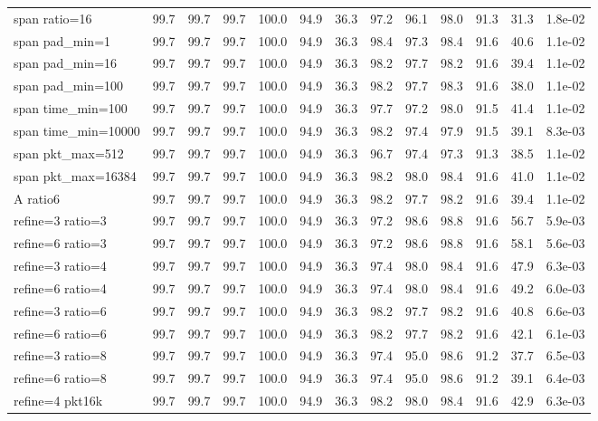\begin{tabular}{@{}lcccccccccccc@{}}
span ratio{=}16 & 99.7 & 99.7 & 99.7 & 100.0 & 94.9 & 36.3 & 97.2 & 96.1 & 98.0 & 91.3 & 31.3 & 1.8e-02 \\
span pad\_min{=}1 & 99.7 & 99.7 & 99.7 & 100.0 & 94.9 & 36.3 & 98.4 & 97.3 & 98.4 & 91.6 & 40.6 & 1.1e-02 \\
span pad\_min{=}16 & 99.7 & 99.7 & 99.7 & 100.0 & 94.9 & 36.3 & 98.2 & 97.7 & 98.2 & 91.6 & 39.4 & 1.1e-02 \\
span pad\_min{=}100 & 99.7 & 99.7 & 99.7 & 100.0 & 94.9 & 36.3 & 98.2 & 97.7 & 98.3 & 91.6 & 38.0 & 1.1e-02 \\
span time\_min{=}100 & 99.7 & 99.7 & 99.7 & 100.0 & 94.9 & 36.3 & 97.7 & 97.2 & 98.0 & 91.5 & 41.4 & 1.1e-02 \\
span time\_min{=}10000 & 99.7 & 99.7 & 99.7 & 100.0 & 94.9 & 36.3 & 98.2 & 97.4 & 97.9 & 91.5 & 39.1 & 8.3e-03 \\
span pkt\_max{=}512 & 99.7 & 99.7 & 99.7 & 100.0 & 94.9 & 36.3 & 96.7 & 97.4 & 97.3 & 91.3 & 38.5 & 1.1e-02 \\
span pkt\_max{=}16384 & 99.7 & 99.7 & 99.7 & 100.0 & 94.9 & 36.3 & 98.2 & 98.0 & 98.4 & 91.6 & 41.0 & 1.1e-02 \\
A ratio6 & 99.7 & 99.7 & 99.7 & 100.0 & 94.9 & 36.3 & 98.2 & 97.7 & 98.2 & 91.6 & 39.4 & 1.1e-02 \\
refine{=}3 ratio{=}3 & 99.7 & 99.7 & 99.7 & 100.0 & 94.9 & 36.3 & 97.2 & 98.6 & 98.8 & 91.6 & 56.7 & 5.9e-03 \\
refine{=}6 ratio{=}3 & 99.7 & 99.7 & 99.7 & 100.0 & 94.9 & 36.3 & 97.2 & 98.6 & 98.8 & 91.6 & 58.1 & 5.6e-03 \\
refine{=}3 ratio{=}4 & 99.7 & 99.7 & 99.7 & 100.0 & 94.9 & 36.3 & 97.4 & 98.0 & 98.4 & 91.6 & 47.9 & 6.3e-03 \\
refine{=}6 ratio{=}4 & 99.7 & 99.7 & 99.7 & 100.0 & 94.9 & 36.3 & 97.4 & 98.0 & 98.4 & 91.6 & 49.2 & 6.0e-03 \\
refine{=}3 ratio{=}6 & 99.7 & 99.7 & 99.7 & 100.0 & 94.9 & 36.3 & 98.2 & 97.7 & 98.2 & 91.6 & 40.8 & 6.6e-03 \\
refine{=}6 ratio{=}6 & 99.7 & 99.7 & 99.7 & 100.0 & 94.9 & 36.3 & 98.2 & 97.7 & 98.2 & 91.6 & 42.1 & 6.1e-03 \\
refine{=}3 ratio{=}8 & 99.7 & 99.7 & 99.7 & 100.0 & 94.9 & 36.3 & 97.4 & 95.0 & 98.6 & 91.2 & 37.7 & 6.5e-03 \\
refine{=}6 ratio{=}8 & 99.7 & 99.7 & 99.7 & 100.0 & 94.9 & 36.3 & 97.4 & 95.0 & 98.6 & 91.2 & 39.1 & 6.4e-03 \\
refine{=}4 pkt16k & 99.7 & 99.7 & 99.7 & 100.0 & 94.9 & 36.3 & 98.2 & 98.0 & 98.4 & 91.6 & 42.9 & 6.3e-03 \\

\end{tabular}

